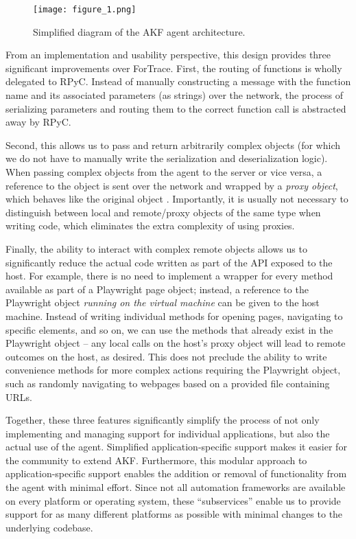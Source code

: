 \begin{figure*}[htbp]
\centering
\texttt{[image: figure\_1.png]}
\caption{Simplified diagram of the AKF agent
architecture.}\label{fig:figure-1}
\end{figure*}

From an implementation and usability perspective, this design provides
three significant improvements over ForTrace. First, the routing of
functions is wholly delegated to RPyC. Instead of manually constructing
a message with the function name and its associated parameters (as
strings) over the network, the process of serializing parameters and
routing them to the correct function call is abstracted away by RPyC.

Second, this allows us to pass and return arbitrarily complex objects
(for which we do not have to manually write the serialization and
deserialization logic). When passing complex objects from the agent to
the server or vice versa, a reference to the object is sent over the
network and wrapped by a \emph{proxy object}, which behaves like the
original object \citep{TheoryOperationRPyC}. Importantly, it is
usually not necessary to distinguish between local and remote/proxy
objects of the same type when writing code, which eliminates the extra
complexity of using proxies.

Finally, the ability to interact with complex remote objects allows us
to significantly reduce the actual code written as part of the API
exposed to the host. For example, there is no need to implement a
wrapper for every method available as part of a Playwright page object;
instead, a reference to the Playwright object \emph{running on the
virtual machine} can be given to the host machine. Instead of writing
individual methods for opening pages, navigating to specific elements,
and so on, we can use the methods that already exist in the Playwright
object -- any local calls on the host's proxy object will lead to remote
outcomes on the host, as desired. This does not preclude the ability to
write convenience methods for more complex actions requiring the
Playwright object, such as randomly navigating to webpages based on a
provided file containing URLs.

Together, these three features significantly simplify the process of not
only implementing and managing support for individual applications, but
also the actual use of the agent. Simplified application-specific
support makes it easier for the community to extend AKF. Furthermore,
this modular approach to application-specific support enables the
addition or removal of functionality from the agent with minimal effort.
Since not all automation frameworks are available on every platform or
operating system, these ``subservices'' enable us to provide support for
as many different platforms as possible with minimal changes to the
underlying codebase.


